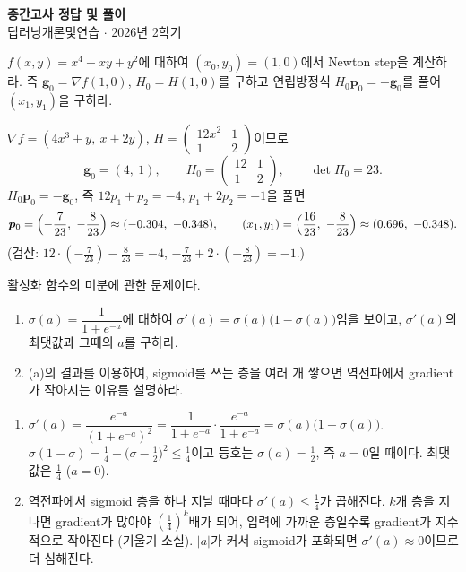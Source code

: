 \documentclass[11pt,a4paper]{article}
\newcommand{\sigmoid}{\sigma}
\begin{document}

\begin{center}
{\LARGE\bfseries 중간고사 정답 및 풀이}\\[0.35em]
{\large 딥러닝개론및연습 $\cdot$ 2026년 2학기}\\[1.0em]
\end{center}

\begin{problems}

\item $f(x,y)=x^4+xy+y^2$에 대하여 $(x_0,y_0)=(1,0)$에서 Newton step을 계산하라.
즉 $\bm g_0=\nabla f(1,0)$, $H_0=H(1,0)$를 구하고 연립방정식 $H_0\bm p_0=-\bm g_0$를 풀어 $(x_1,y_1)$을 구하라.

\begin{solbox}
$\nabla f=(4x^3+y,\ x+2y)$, $H=\begin{pmatrix}12x^2&1\\1&2\end{pmatrix}$이므로
\[
\bm g_0=(4,\ 1),
\qquad
H_0=\begin{pmatrix}12&1\\1&2\end{pmatrix},
\qquad
\det H_0=23.
\]
$H_0\bm p_0=-\bm g_0$, 즉 $12p_1+p_2=-4$, $p_1+2p_2=-1$을 풀면
\[
\bm p_0=\Bigl(-\frac{7}{23},\ -\frac{8}{23}\Bigr)\approx(-0.304,\ -0.348),
\qquad
(x_1,y_1)=\Bigl(\frac{16}{23},\ -\frac{8}{23}\Bigr)\approx(0.696,\ -0.348).
\]
(검산: $12\cdot(-\tfrac{7}{23})-\tfrac{8}{23}=-4$, $-\tfrac{7}{23}+2\cdot(-\tfrac{8}{23})=-1$.)
\end{solbox}

\item 활성화 함수의 미분에 관한 문제이다.
\begin{enumerate}[label=(\alph*),leftmargin=2em]
\item $\sigmoid(a)=\dfrac{1}{1+e^{-a}}$에 대하여 $\sigmoid'(a)=\sigmoid(a)\bigl(1-\sigmoid(a)\bigr)$임을 보이고,
$\sigmoid'(a)$의 최댓값과 그때의 $a$를 구하라.
\item (a)의 결과를 이용하여, sigmoid를 쓰는 층을 여러 개 쌓으면 역전파에서 gradient가 작아지는 이유를 설명하라.
\end{enumerate}

\begin{solbox}
\begin{enumerate}[label=(\alph*),leftmargin=1.8em]
\item $\sigmoid'(a)=\dfrac{e^{-a}}{(1+e^{-a})^2}=\dfrac{1}{1+e^{-a}}\cdot\dfrac{e^{-a}}{1+e^{-a}}=\sigmoid(a)\bigl(1-\sigmoid(a)\bigr)$.
$\sigmoid(1-\sigmoid)=\frac14-\bigl(\sigmoid-\frac12\bigr)^2\le\frac14$이고 등호는 $\sigmoid(a)=\frac12$, 즉 $a=0$일 때이다.
최댓값은 $\frac14$ ($a=0$).
\item 역전파에서 sigmoid 층을 하나 지날 때마다 $\sigmoid'(a)\le\frac14$가 곱해진다.
$k$개 층을 지나면 gradient가 많아야 $(\frac14)^k$배가 되어, 입력에 가까운 층일수록 gradient가 지수적으로 작아진다 (기울기 소실).
$|a|$가 커서 sigmoid가 포화되면 $\sigmoid'(a)\approx0$이므로 더 심해진다.
\end{enumerate}
\end{solbox}


\end{problems}
\end{document}
